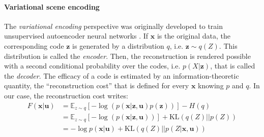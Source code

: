 \documentclass{article}
\begin{document}
\paragraph{Variational scene encoding}\label{sec:encoding}
The \emph{variational encoding} perspective  was originally developed 
to train unsupervised autoencoder neural networks \citep{hinton2006reducing}. 
If $\boldsymbol{x}$ is the original data, the corresponding code $\boldsymbol{z}$ is generated by a distribution $q$, i.e. $\boldsymbol{z} \sim q(Z)$. This distribution is called the \emph{encoder}. Then, the reconstruction is rendered possible with a second conditional probability over the codes, i.e. $p(X|\boldsymbol{z})$, that is called the \emph{decoder}. 
The efficacy of a code is estimated by an information-theoretic quantity, the ``reconstruction cost'' \citep{hinton1994autoencoders} that is defined for every $\boldsymbol{x}$ knowing $p$ and $q$.
In our case, the reconstruction cost writes:
\begin{align}
F(\boldsymbol{x}|\boldsymbol{u}) 
&= \mathbb{E}_{z\sim q} \left[-\log (p(\boldsymbol{x}|\boldsymbol{z},\boldsymbol{u})p(\boldsymbol{z}))\right] - H(q)\\
&= \mathbb{E}_{z\sim q} \left[-\log (p(\boldsymbol{x}|\boldsymbol{z},\boldsymbol{u}))\right] +\text{KL}(q(Z)||p(Z))
\label{eq:FEP-prior-u}\\
&= - \log p(\boldsymbol{x}|\boldsymbol{u}) + \text{KL}(q(Z)||p(Z|\boldsymbol{x}, \boldsymbol{u}))
\label{eq:FEP-posterior-u}\end{align}
\end{document}
